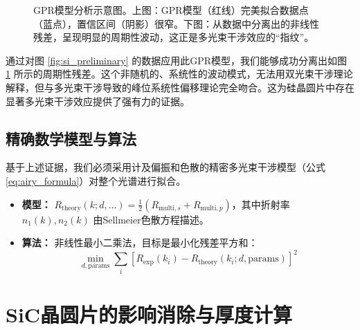 \documentclass[UTF8, 12pt]{ctexart}
\begin{document}
\begin{figure}[H]
    \centering
    \caption{GPR模型分析示意图。上图：GPR模型（红线）完美拟合数据点（蓝点），置信区间（阴影）很窄。下图：从数据中分离出的非线性残差，呈现明显的周期性波动，这正是多光束干涉效应的“指纹”。}
    \label{fig:gpr_schematic}
\end{figure}

通过对图 \ref{fig:si_preliminary} 的数据应用此GPR模型，我们能够成功分离出如图 \ref{fig:gpr_schematic} 所示的周期性残差。这个非随机的、系统性的波动模式，无法用双光束干涉理论解释，但与多光束干涉导致的峰位系统性偏移理论完全吻合。这为硅晶圆片中存在显著多光束干涉效应提供了强有力的证据。

\subsection{精确数学模型与算法}
基于上述证据，我们必须采用计及偏振和色散的精密多光束干涉模型（公式 \ref{eq:airy_formula}）对整个光谱进行拟合。
\begin{itemize}
    \item \textbf{模型：} $R_{\text{theory}}(k; d, \dots) = \frac{1}{2} (R_{\text{multi}, s} + R_{\text{multi}, p})$，其中折射率 $n_1(k), n_2(k)$ 由Sellmeier色散方程描述。
    \item \textbf{算法：} 非线性最小二乘法，目标是最小化残差平方和：
    \begin{equation}
        \min_{d, \text{params}} \sum_{i} \left[ R_{\text{exp}}(k_i) - R_{\text{theory}}(k_i; d, \text{params}) \right]^2
    \end{equation}
\end{itemize}



\section{SiC晶圆片的影响消除与厚度计算}
\end{document}
